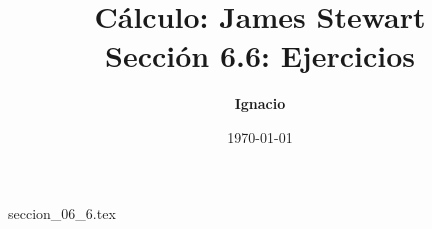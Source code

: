 \documentclass[11pt,spanish,oneside]{report}
\title{\textbf{Cálculo: James Stewart} \\ \Large Sección 6.6: Ejercicios}
\author{\textbf{Ignacio}}
\date{\today}
\begin{document}
\maketitle

{seccion_06_6.tex}
\end{document}
